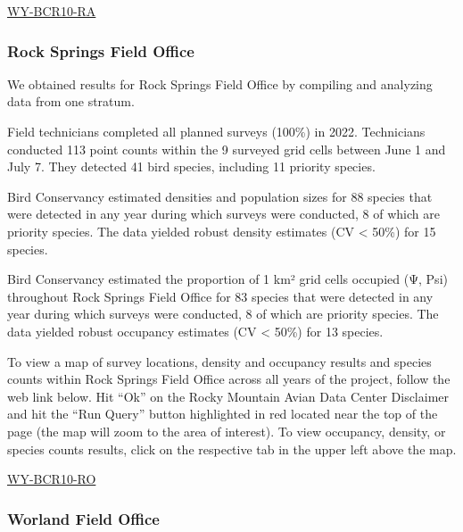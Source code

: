 \documentclass[
  letterpaper,
  DIV=11,
  numbers=noendperiod,
  oneside]{scrreprt}
\begin{document}
\href{http://www.rmbo.org/new_site/adc/QueryWindow.aspx\#N4IgzgLgTghhCuBbEAuABCA6gTQLQCEBhAJQEYAGXYgQXX3igFMZ40B7AMzQBkYA7ACZoAsvxgBzRokZ8IaXGmIwA7gBsAlnzBoAYusaqhAeQ4d1AY0YgAvkA===}{WY-BCR10-RA}

\hypertarget{rock-springs-field-office}{%
\subsubsection{Rock Springs Field
Office}\label{rock-springs-field-office}}

We obtained results for Rock Springs Field Office by compiling and
analyzing data from one stratum.

Field technicians completed all planned surveys (100\%) in 2022.
Technicians conducted 113 point counts within the 9 surveyed grid cells
between June 1 and July 7. They detected 41 bird species, including 11
priority species.

Bird Conservancy estimated densities and population sizes for 88 species
that were detected in any year during which surveys were conducted, 8 of
which are priority species. The data yielded robust density estimates
(CV \textless{} 50\%) for 15 species.

Bird Conservancy estimated the proportion of 1 km² grid cells occupied
(Ψ, Psi) throughout Rock Springs Field Office for 83 species that were
detected in any year during which surveys were conducted, 8 of which are
priority species. The data yielded robust occupancy estimates (CV
\textless{} 50\%) for 13 species.

To view a map of survey locations, density and occupancy results and
species counts within Rock Springs Field Office across all years of the
project, follow the web link below. Hit ``Ok'' on the Rocky Mountain
Avian Data Center Disclaimer and hit the ``Run Query'' button
highlighted in red located near the top of the page (the map will zoom
to the area of interest). To view occupancy, density, or species counts
results, click on the respective tab in the upper left above the map.

\href{http://www.rmbo.org/new_site/adc/QueryWindow.aspx\#N4IgzgLgTghhCuBbEAuABCA6gTQLQCEBhAJQEYAGXYgeXX3igFMZ40B7AMzQBkYA7ACZoAsvxgBzRokZ8IaXGmJsAxgGs0AZQAOUAJZ9xYNADFdjADZDqHDruWMQAXyA}{WY-BCR10-RO}

\hypertarget{worland-field-office}{%
\subsubsection{Worland Field Office}\label{worland-field-office}}
\end{document}
